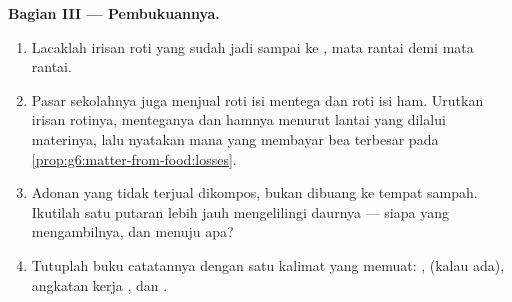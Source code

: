 \begin{problem}
\medskip\noindent\textbf{Bagian III --- Pembukuannya.}
\begin{enumerate}[resume]
  \item Lacaklah irisan roti yang sudah jadi sampai ke , mata
        rantai demi mata rantai.
  \item Pasar sekolahnya juga menjual roti isi mentega dan roti isi
        ham. Urutkan irisan rotinya, menteganya dan hamnya menurut
        lantai yang dilalui materinya, lalu nyatakan mana yang membayar
        bea terbesar pada
        \cref{prop:g6:matter-from-food:losses}.
  \item Adonan yang tidak terjual dikompos, bukan dibuang ke tempat
        sampah. Ikutilah  satu putaran lebih jauh
        mengelilingi daurnya --- siapa yang mengambilnya, dan menuju
        apa?
  \item Tutuplah buku catatannya dengan satu kalimat yang memuat:
        ,  (kalau ada), angkatan kerja , dan
        .
\end{enumerate}
\end{problem}
